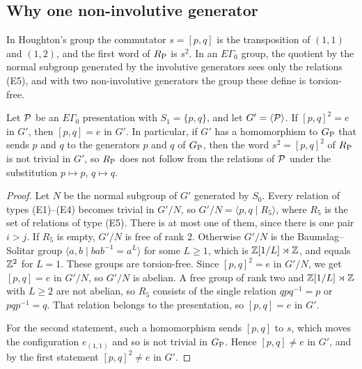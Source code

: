\subsection{Why one non-involutive generator}

In Houghton's group the commutator $s=[p,q]$ is the transposition of $(1,1)$ and $(1,2)$, and the first word of $R_{\mathrm P}$ is $s^2$. In an
$E\Gamma_0$ group, the quotient by the normal subgroup generated by the involutive generators sees only the relations (E5), and with two
non-involutive generators the group these define is torsion-free.

\begin{proposition}\label{prop:one-noninv}
Let $\mathcal P$ be an $E\Gamma_0$ presentation with $S_1=\{p,q\}$, and let $G'=\langle\mathcal P\rangle$. If $[p,q]^2=e$ in $G'$, then $[p,q]=e$
in $G'$. In particular, if $G'$ has a homomorphism to $G_{\mathrm P}$ that sends $p$ and $q$ to the generators $p$ and $q$ of $G_{\mathrm P}$, then the word
$s^2=[p,q]^2$ of $R_{\mathrm P}$ is not trivial in $G'$, so $R_{\mathrm P}$ does not follow from the relations of $\mathcal P$ under the substitution $p\mapsto p$,
$q\mapsto q$.
\end{proposition}

\begin{proof}
Let $N$ be the normal subgroup of $G'$ generated by $S_0$. Every relation of types (E1)--(E4) becomes trivial in $G'/N$, so
$G'/N=\langle p,q\mid R_5\rangle$, where $R_5$ is the set of relations of type (E5). There is at most one of them, since there is one pair
$i>j$. If $R_5$ is empty, $G'/N$ is free of rank $2$. Otherwise $G'/N$ is the Baumslag--Solitar group $\langle a,b\mid bab^{-1}=a^L\rangle$
for some $L\ge1$, which is $\mathbb Z[1/L]\rtimes\mathbb Z$, and equals $\mathbb Z^2$ for $L=1$. These groups are torsion-free. Since $[p,q]^2=e$ in $G'/N$, we
get $[p,q]=e$ in $G'/N$, so $G'/N$ is abelian. A free group of rank two and $\mathbb Z[1/L]\rtimes\mathbb Z$ with $L\ge2$ are not abelian, so $R_5$
consists of the single relation $qpq^{-1}=p$ or $pqp^{-1}=q$. That relation belongs to the presentation, so $[p,q]=e$ in $G'$.

For the second statement, such a homomorphism sends $[p,q]$ to $s$, which moves the configuration $e_{(1,1)}$ and so is not trivial in
$G_{\mathrm P}$. Hence $[p,q]\ne e$ in $G'$, and by the first statement $[p,q]^2\ne e$ in $G'$.
\end{proof}

